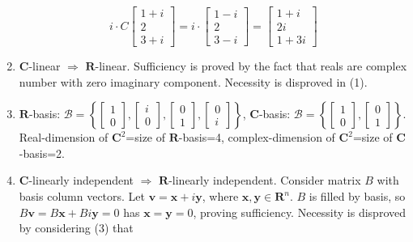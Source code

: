 \documentclass{article}
\begin{document}
\begin{enumerate}
    \[i\cdot C\left[\begin{array}{c}1+i\\2\\3+i\end{array}\right]=i\cdot \left[\begin{array}{c}1-i\\2\\3-i\end{array}\right]=\left[\begin{array}{c}1+i\\2i\\1+3i\end{array}\right]\]
    \item $\mathbf{C}$-linear $\Rightarrow$ $\mathbf{R}$-linear. Sufficiency is proved by the fact that reals are complex number with zero imaginary component. Necessity is disproved in (1).
    \item $\mathbf{R}$-basis: $\mathcal{B}=\left\{\left[\begin{array}{r}1\\0\end{array}\right],\left[\begin{array}{r}i\\0\end{array}\right],\left[\begin{array}{r}0\\1\end{array}\right],\left[\begin{array}{r}0\\i\end{array}\right]\right\}$, 
    $\mathbf{C}$-basis: $\mathcal{B}=\left\{\left[\begin{array}{r}1\\0\end{array}\right],\left[\begin{array}{r}0\\1\end{array}\right]\right\}$.\newline
    Real-dimension of $\mathbf{C}^2$=size of $\mathbf{R}$-basis=4,
    complex-dimension of $\mathbf{C}^2$=size of $\mathbf{C}$-basis=2.
    \item $\mathbf{C}$-linearly independent $\Rightarrow$ $\mathbf{R}$-linearly independent. Consider matrix $B$ with basis column vectors. Let $\mathbf{v}=\mathbf{x}+i\mathbf{y}$, where $\mathbf{x},\mathbf{y}\in\mathbf{R}^n$. $B$ is filled by basis, so $B\mathbf{v}=B\mathbf{x}+Bi\mathbf{y}=0$ has $\mathbf{x}=\mathbf{y}=0$, proving sufficiency. Necessity is disproved by considering (3) that 

\end{enumerate}
\end{document}
